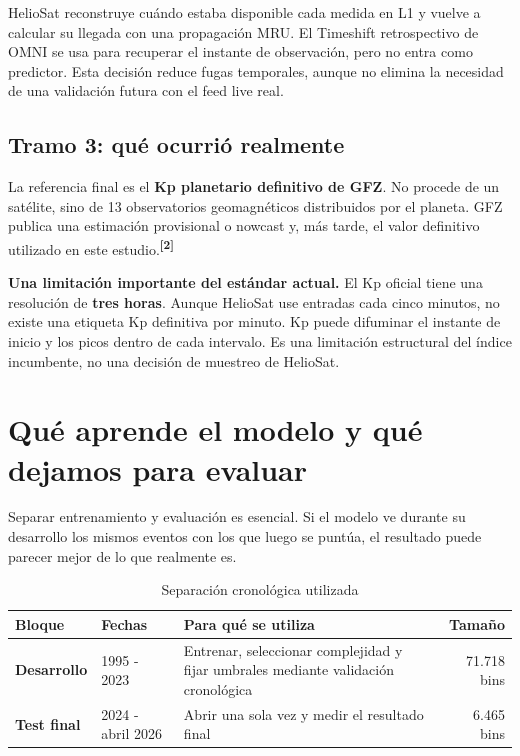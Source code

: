 \documentclass[10pt,a4paper]{article}
\let\plainsection\section
\renewcommand{\section}[1]{\plainsection{\color{Navy}#1}}
\let\plainsubsection\subsection
\renewcommand{\subsection}[1]{\plainsubsection{\color{Ink}#1}}
\newenvironment{warningbox}{\begin{center}\setlength{\fboxsep}{4mm}\begin{lrbox}{\warningsave}\begin{minipage}{0.90\textwidth}}{\end{minipage}\end{lrbox}\colorbox{AmberSoft}{\usebox{\warningsave}}\end{center}}
\newcommand{\source}[1]{\textsuperscript{\color{Cyan}\textbf{[#1]}}}
\begin{document}
HelioSat reconstruye cuándo estaba disponible cada medida en L1 y vuelve a calcular su llegada con una propagación MRU. El Timeshift retrospectivo de OMNI se usa para recuperar el instante de observación, pero no entra como predictor. Esta decisión reduce fugas temporales, aunque no elimina la necesidad de una validación futura con el feed live real.

\subsection{Tramo 3: qué ocurrió realmente}

La referencia final es el \textbf{Kp planetario definitivo de GFZ}. No procede de un satélite, sino de 13 observatorios geomagnéticos distribuidos por el planeta. GFZ publica una estimación provisional o nowcast y, más tarde, el valor definitivo utilizado en este estudio.\source{2}

\begin{warningbox}
\textbf{Una limitación importante del estándar actual.} El Kp oficial tiene una resolución de \textbf{tres horas}. Aunque HelioSat use entradas cada cinco minutos, no existe una etiqueta Kp definitiva por minuto. Kp puede difuminar el instante de inicio y los picos dentro de cada intervalo. Es una limitación estructural del índice incumbente, no una decisión de muestreo de HelioSat.
\end{warningbox}

\section{Qué aprende el modelo y qué dejamos para evaluar}

Separar entrenamiento y evaluación es esencial. Si el modelo ve durante su desarrollo los mismos eventos con los que luego se puntúa, el resultado puede parecer mejor de lo que realmente es.

\begin{table}[H]
\centering
\caption*{Separación cronológica utilizada}
\begin{tabularx}{\textwidth}{>{\bfseries}p{31mm}p{34mm}Xr}
\toprule
Bloque & Fechas & Para qué se utiliza & Tamaño\\
\midrule
Desarrollo & 1995 - 2023 & Entrenar, seleccionar complejidad y fijar umbrales mediante validación cronológica & 71.718 bins\\
Test final & 2024 - abril 2026 & Abrir una sola vez y medir el resultado final & 6.465 bins\\
\bottomrule
\end{tabularx}
\end{table}
\end{document}
